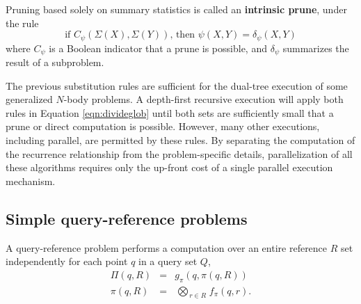 \documentclass[times, leqno,twocolumn]{article}
\newcommand{\defterm}[1]{{\bf #1}}
\newcommand{\myOp}[1]{\mathop{\bigotimes\nolimits\!\!_{#1}}}
\newcommand{\letterglob}{\psi}
\newcommand{\inglob}{\psi}
\newcommand{\canpruneglob}{C_{\letterglob}}
\newcommand{\deltaglob}{\delta_{\letterglob}}
\newcommand{\letterqr}{\pi}
\newcommand{\outqr}{\Pi}
\newcommand{\inqr}{\pi}
\newcommand{\Opqr}{\myOp{\letterqr}}
\newcommand{\fqr}{f_{\letterqr}}
\newcommand{\gqr}{g_{\letterqr}}
\newcommand{\outstat}{\Sigma}
\begin{document}
Pruning based solely on summary statistics is called an \defterm{intrinsic prune}, under the rule
\begin{equation}
\text{if } \canpruneglob(\outstat(X), \outstat(Y)) \text{, then } \inglob(X, Y) = \deltaglob(X, Y)
\label{eqn:intrinsic}
\end{equation}
\noindent where $\canpruneglob$ is a Boolean indicator that a prune is possible, and $\deltaglob$ summarizes the result of a subproblem.

\noindent The previous substitution rules are sufficient for the dual-tree execution of some generalized $N$-body problems.
A depth-first recursive execution will apply both rules in Equation \ref{eqn:divideglob} until both sets are sufficiently small that a prune or direct computation is possible.
However, many other executions, including parallel, are permitted by these rules.
By separating the computation of the recurrence relationship from the problem-specific details, parallelization of all these algorithms requires only the up-front cost of a single parallel execution mechanism.


\subsection{Simple query-reference problems}

A query-reference problem performs a computation over an entire reference $R$ set independently for each point $q$ in a query set $Q$,
\begin{eqnarray}
\outqr(q, R) &=& \gqr(q, \inqr(q, R))
\\
\inqr(q, R) &=& \Opqr_{r \in R} \fqr(q, r).
\end{eqnarray}
\end{document}
